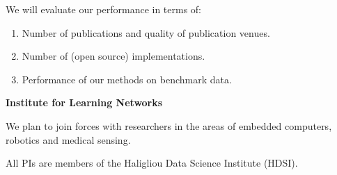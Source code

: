\documentclass{article}
\begin{document}
We will evaluate our performance in terms of:
\begin{enumerate}
\item Number of publications and quality of publication venues.
\item Number of (open source) implementations.
\item Performance of our methods on benchmark data.
\end{enumerate}

{\bf Institute for Learning Networks}\\

We plan to join forces with researchers in the areas of embedded
computers, robotics and medical sensing.

All PIs are members of the Haligliou Data Science Institute (HDSI).

\bigskip
\end{document}
